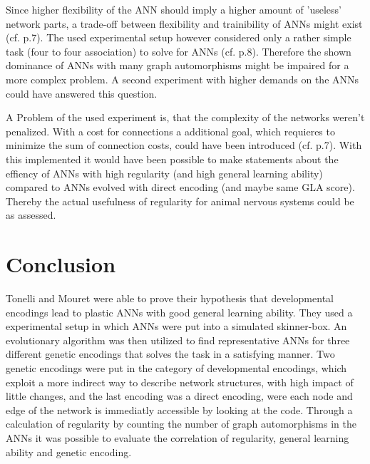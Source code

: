 \documentclass[12pt,twoside]{article}
\theoremstyle{plain}
\theoremstyle{definition}
\theoremstyle{remark}
\begin{document}
Since higher flexibility of the ANN should imply a higher amount of 'useless' network parts, a trade-off between flexibility and trainibility of ANNs might exist (cf. \cite{citeulike:12788284} p.7).
The used experimental setup however considered only a rather simple task (four to four association) to solve for ANNs (cf. \cite{citeulike:12788284} p.8).
Therefore the  shown dominance of ANNs with many graph automorphisms might be impaired for a more complex problem. A second experiment with higher demands on the ANNs could have answered this question.\medskip
 
A Problem of the used experiment is, that the complexity of the networks weren't penalized. With a cost for connections a additional goal, which requieres to minimize the sum of connection costs, could have been introduced (cf. \cite{citeulike:12788284} p.7).
With this implemented it would have been possible to make statements about the effiency of ANNs with high regularity (and high general learning ability) compared to ANNs evolved with direct encoding (and maybe same GLA score).
Thereby the actual usefulness of regularity for animal nervous systems could be as assessed.



\section{Conclusion}
\label{sec:concl}

Tonelli and Mouret were able to prove their hypothesis that developmental encodings lead to plastic ANNs with good general learning ability.
They used a experimental setup in which ANNs were put into a simulated skinner-box. An evolutionary algorithm was then utilized to find representative ANNs for three different genetic encodings that solves the task in a satisfying manner.
Two genetic encodings were put in the category of developmental encodings, which exploit a more indirect way to describe network structures, with high impact of little changes, and the last encoding was a direct encoding, were each node and edge of the network is immediatly accessible by looking at the code.
Through a calculation of regularity by counting the number of graph automorphisms in the ANNs it was possible to evaluate the correlation of regularity, general learning ability and genetic encoding.\medskip
\end{document}
